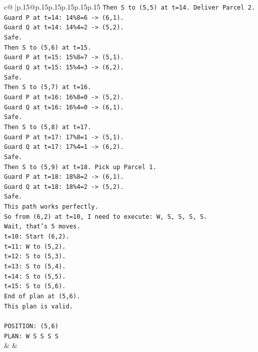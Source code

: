 \documentclass{article}
\begin{document}
{\begin{supertabular}{c@{$\;$}|p{.15\linewidth}@{}p{.15\linewidth}p{.15\linewidth}p{.15\linewidth}p{.15\linewidth}p{.15\linewidth}}
{{{\texttt{Then S to (5,5) at t=14. Deliver Parcel 2.} \\
\texttt{Guard P at t=14: 14\%8=6 {-}> (6,1).} \\
\texttt{Guard Q at t=14: 14\%4=2 {-}> (5,2).} \\
\texttt{Safe.} \\
\texttt{Then S to (5,6) at t=15.} \\
\texttt{Guard P at t=15: 15\%8=7 {-}> (5,1).} \\
\texttt{Guard Q at t=15: 15\%4=3 {-}> (6,2).} \\
\texttt{Safe.} \\
\texttt{Then S to (5,7) at t=16.} \\
\texttt{Guard P at t=16: 16\%8=0 {-}> (5,2).} \\
\texttt{Guard Q at t=16: 16\%4=0 {-}> (6,1).} \\
\texttt{Safe.} \\
\texttt{Then S to (5,8) at t=17.} \\
\texttt{Guard P at t=17: 17\%8=1 {-}> (5,1).} \\
\texttt{Guard Q at t=17: 17\%4=1 {-}> (6,2).} \\
\texttt{Safe.} \\
\texttt{Then S to (5,9) at t=18. Pick up Parcel 1.} \\
\texttt{Guard P at t=18: 18\%8=2 {-}> (6,1).} \\
\texttt{Guard Q at t=18: 18\%4=2 {-}> (5,2).} \\
\texttt{Safe.} \\
\texttt{This path works perfectly.} \\
\texttt{So from (6,2) at t=10, I need to execute: W, S, S, S, S.} \\
\texttt{Wait, that's 5 moves.} \\
\texttt{t=10: Start (6,2).} \\
\texttt{t=11: W to (5,2).} \\
\texttt{t=12: S to (5,3).} \\
\texttt{t=13: S to (5,4).} \\
\texttt{t=14: S to (5,5).} \\
\texttt{t=15: S to (5,6).} \\
\texttt{End of plan at (5,6).} \\
\texttt{This plan is valid.} \\
\\ 
\texttt{POSITION: (5,6)} \\
\texttt{PLAN: W S S S S} \\
            }
        }
    }
    & & \\ \\


\end{supertabular}}
\end{document}
